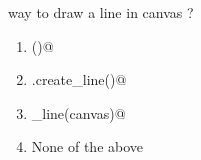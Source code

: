 \question
\lstinline@rrect@ way to draw a line in canvas \lstinline@tkinter@?

\begin{enumerate}
\item \lstinline@line()@
\item \lstinline@canvas.create_line()@
\item \lstinline@create_line(canvas)@
\item None of the above
\end{enumerate}

